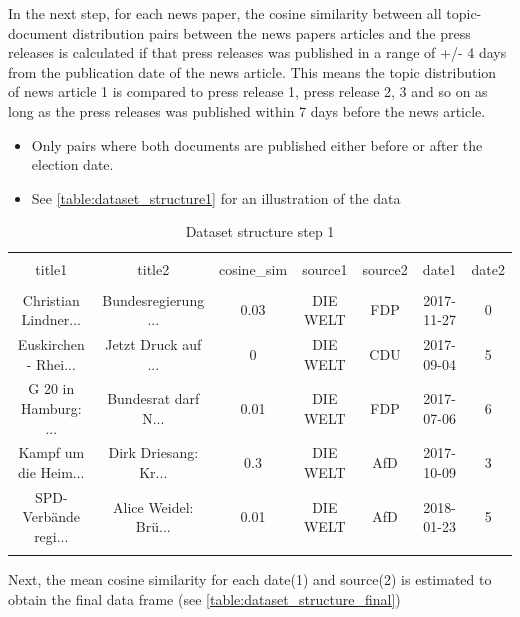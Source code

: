 \documentclass[
]{article}
\providecommand{\tightlist}{%
  \setlength{\itemsep}{0pt}\setlength{\parskip}{0pt}}
\begin{document}
In the next step, for each news paper, the cosine similarity between all
topic-document distribution pairs between the news papers articles and
the press releases is calculated if that press releases was published in
a range of +/- 4 days from the publication date of the news article.
This means the topic distribution of news article 1 is compared to press
release 1, press release 2, 3 and so on as long as the press releases
was published within 7 days before the news article.

\begin{itemize}
\tightlist
\item
  Only pairs where both documents are published either before or after
  the election date.
\item
  See \autoref{table:dataset_structure1} for an illustration of the data
\end{itemize}

\begin{table}[!htbp] \centering 
  \caption{Dataset structure step 1} 
  \label{table:dataset_structure1} 
\tiny 
\begin{tabular}{@{\extracolsep{5pt}} ccccccc} 
\\[-1.8ex]\hline 
\hline \\[-1.8ex] 
title1 & title2 & cosine\_sim & source1 & source2 & date1 & date2 \\ 
\hline \\[-1.8ex] 
Christian Lindner... &  Bundesregierung ... & 0.03 & DIE WELT & FDP & 2017-11-27 & 0 \\ 
Euskirchen - Rhei... &  Jetzt Druck auf ... & 0 & DIE WELT & CDU & 2017-09-04 & 5 \\ 
G 20 in Hamburg: ... &  Bundesrat darf N... & 0.01 & DIE WELT & FDP & 2017-07-06 & 6 \\ 
Kampf um die Heim... & Dirk Driesang: Kr... & 0.3 & DIE WELT & AfD & 2017-10-09 & 3 \\ 
SPD-Verbände regi... & Alice Weidel: Brü... & 0.01 & DIE WELT & AfD & 2018-01-23 & 5 \\ 
\hline \\[-1.8ex] 
\end{tabular} 
\end{table}

Next, the mean cosine similarity for each date(1) and source(2) is
estimated to obtain the final data frame (see
\autoref{table:dataset_structure_final})
\end{document}
